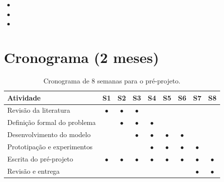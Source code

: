 \documentclass[12pt,a4paper]{article}
\begin{document}
\lipsum[32-33]

\begin{itemize}
  \item \lipsum[34][1-2]
  \item \lipsum[34][3-4]
  \item \lipsum[35][1-2]
\end{itemize}

\section{Cronograma (2 meses)}

\lipsum[36]

\begin{table}[h]
  \centering
  \begin{tabular}{|l|c|c|c|c|c|c|c|c|}
    \hline
    \textbf{Atividade} & \textbf{S1} & \textbf{S2} & \textbf{S3} & \textbf{S4} & \textbf{S5} & \textbf{S6} & \textbf{S7} & \textbf{S8} \\
    \hline
    Revisão da literatura        & $\bullet$ & $\bullet$ & $\bullet$ &           &           &           &           &           \\
    \hline
    Definição formal do problema &           & $\bullet$ & $\bullet$ & $\bullet$ &           &           &           &           \\
    \hline
    Desenvolvimento do modelo    &           &           & $\bullet$ & $\bullet$ & $\bullet$ & $\bullet$ &           &           \\
    \hline
    Prototipação e experimentos  &           &           &           & $\bullet$ & $\bullet$ & $\bullet$ & $\bullet$ &           \\
    \hline
    Escrita do pré-projeto       & $\bullet$ & $\bullet$ & $\bullet$ & $\bullet$ & $\bullet$ & $\bullet$ & $\bullet$ & $\bullet$ \\
    \hline
    Revisão e entrega            &           &           &           &           &           &           & $\bullet$ & $\bullet$ \\
    \hline
  \end{tabular}
  \caption{Cronograma de 8 semanas para o pré-projeto.}
\end{table}

\newpage


\end{document}
